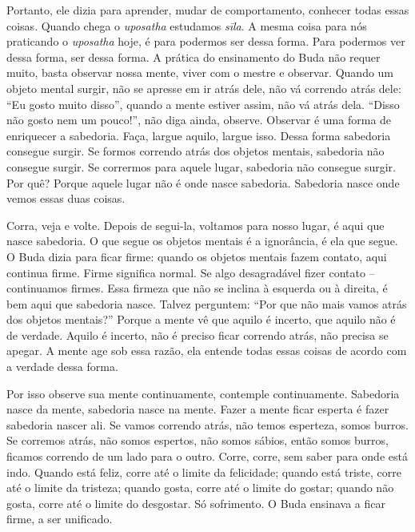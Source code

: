 Portanto, ele dizia para aprender, mudar de comportamento, conhecer
todas essas coisas. Quando chega o \textit{uposatha} estudamos
\textit{sīla}. A mesma coisa para nós praticando o \textit{uposatha}
hoje, é para podermos ser dessa forma. Para podermos ver dessa forma,
ser dessa forma. A prática do ensinamento do Buda não requer muito,
basta observar nossa mente, viver com o mestre e observar. Quando um
objeto mental surgir, não se apresse em ir atrás dele, não vá correndo
atrás dele: “Eu gosto muito disso”, quando a mente estiver assim, não
vá atrás dela. “Disso não gosto nem um pouco!”, não diga ainda,
observe. Observar é uma forma de enriquecer a sabedoria. Faça, largue
aquilo, largue isso. Dessa forma sabedoria consegue surgir. Se formos
correndo atrás dos objetos mentais, sabedoria não consegue surgir. Se
corrermos para aquele lugar, sabedoria não consegue surgir. Por quê?
Porque aquele lugar não é onde nasce sabedoria. Sabedoria nasce onde
vemos essas duas coisas. 

Corra, veja e volte. Depois de segui-la, voltamos para nosso lugar,
é aqui que nasce sabedoria. O que segue os objetos mentais é a
ignorância, é ela que segue. O Buda dizia para ficar firme: quando os
objetos mentais fazem contato, aqui continua firme. Firme significa
normal. Se algo desagradável fizer contato – continuamos firmes. Essa
firmeza que não se inclina à esquerda ou à direita, é bem aqui que
sabedoria nasce. Talvez perguntem: “Por que não mais vamos atrás dos
objetos mentais?” Porque a mente vê que aquilo é incerto, que aquilo
não é de verdade. Aquilo é incerto, não é preciso ficar correndo atrás,
não precisa se apegar. A mente age sob essa razão, ela entende todas
essas coisas de acordo com a verdade dessa forma. 

Por isso observe sua mente continuamente, contemple continuamente.
Sabedoria nasce da mente, sabedoria nasce na mente. Fazer a mente ficar
esperta é fazer sabedoria nascer ali. Se vamos correndo atrás, não
temos esperteza, somos burros. Se corremos atrás, não somos espertos,
não somos sábios, então somos burros, ficamos correndo de um lado para
o outro. Corre, corre, sem saber para onde está indo. Quando está
feliz, corre até o limite da felicidade; quando está triste, corre até
o limite da tristeza; quando gosta, corre até o limite do gostar;
quando não gosta, corre até o limite do desgostar. Só sofrimento. O
Buda ensinava a ficar firme, a ser unificado. 


